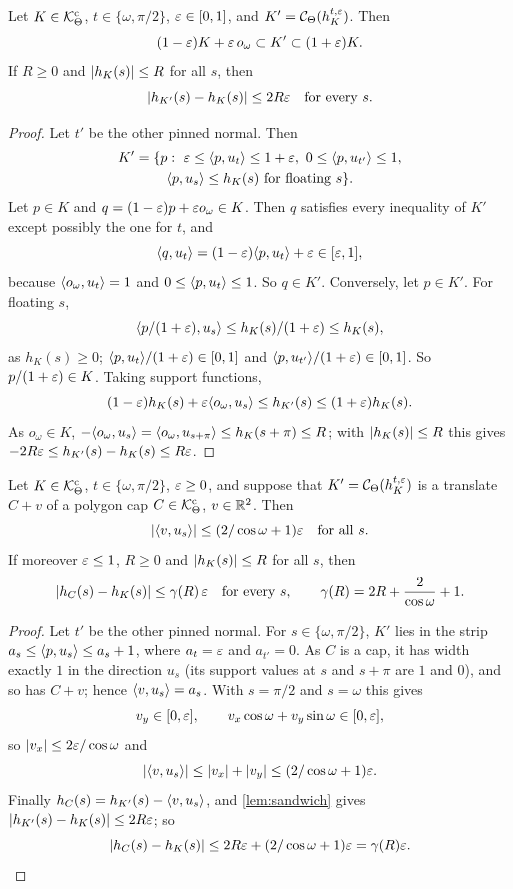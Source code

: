 \begin{lemma}\label{lem:sandwich}
Let $K\in\mathcal{K}^{\mathrm{c}}_\Theta$, $t\in\{\omega,\pi/2\}$, $\varepsilon\in[0,1]$, and
$K'=\mathcal{C}_\Theta(h_K^{t,\varepsilon})$. Then
\[
  (1-\varepsilon)K+\varepsilon\,o_\omega\subset K'\subset(1+\varepsilon)K .
\]
If $R\ge0$ and $\lvert h_K(s)\rvert\le R$ for all $s$, then
\[
  \lvert h_{K'}(s)-h_K(s)\rvert\le2R\varepsilon\quad\text{for every }s.
\]
\end{lemma}

\begin{proof}
Let $t'$ be the other pinned normal. Then
\begin{multline*}
  K'=\{p:\ \varepsilon\le\langle p,u_t\rangle\le1+\varepsilon,\ 0\le\langle p,u_{t'}\rangle\le1,\\
    \langle p,u_s\rangle\le h_K(s)\text{ for floating }s\}.
\end{multline*}
Let $p\in K$ and $q=(1-\varepsilon)p+\varepsilon o_\omega\in K$. Then $q$ satisfies every
inequality of $K'$ except possibly the one for $t$, and
\[
  \langle q,u_t\rangle=(1-\varepsilon)\langle p,u_t\rangle+\varepsilon\in[\varepsilon,1],
\]
because $\langle o_\omega,u_t\rangle=1$ and $0\le\langle p,u_t\rangle\le1$. So $q\in K'$.
Conversely, let $p\in K'$. For floating $s$,
\[
  \langle p/(1+\varepsilon),u_s\rangle\le h_K(s)/(1+\varepsilon)\le h_K(s),
\]
as $h_K(s)\ge0$; $\langle p,u_t\rangle/(1+\varepsilon)\in[0,1]$ and $\langle p,u_{t'}\rangle/(1+\varepsilon)\in[0,1]$. So ${p/(1+\varepsilon)\in K}$. Taking support functions,
\[
  (1-\varepsilon)h_K(s)+\varepsilon\langle o_\omega,u_s\rangle\le h_{K'}(s)\le(1+\varepsilon)h_K(s).
\]
As $o_\omega\in K$, $-\langle o_\omega,u_s\rangle=\langle o_\omega,u_{s+\pi}\rangle\le
h_K(s+\pi)\le R$; with $\lvert h_K(s)\rvert\le R$ this gives $-2R\varepsilon\le
h_{K'}(s)-h_K(s)\le R\varepsilon$.
\end{proof}

\begin{lemma}\label{lem:back}
Let $K\in\mathcal{K}^{\mathrm{c}}_\Theta$, $t\in\{\omega,\pi/2\}$, $\varepsilon\ge0$, and suppose that
$K'=\mathcal{C}_\Theta(h_K^{t,\varepsilon})$ is a translate $C+v$ of a polygon cap
$C\in\mathcal{K}^{\mathrm{c}}_\Theta$, $v\in\mathbb{R}^2$. Then
\[
  \lvert \langle v,u_s\rangle\rvert\le(2/\cos\omega+1)\varepsilon\quad\text{for all }s.
\]
If moreover $\varepsilon\le1$, $R\ge0$ and $\lvert h_K(s)\rvert\le R$ for all $s$, then
\[
  \lvert h_C(s)-h_K(s)\rvert\le \gamma(R)\,\varepsilon\quad\text{for every }s,\qquad \gamma(R)
    =2R+\frac2{\cos\omega}+1 .
\]
\end{lemma}

\begin{proof}
Let $t'$ be the other pinned normal. For $s\in\{\omega,\pi/2\}$, $K'$ lies in
the strip $a_s\le\langle p,u_s\rangle\le a_s+1$, where $a_t=\varepsilon$ and $a_{t'}=0$. As $C$
is a cap, it has width exactly $1$ in the direction $u_s$ (its support values at
$s$ and $s+\pi$ are $1$ and $0$), and so has $C+v$; hence $\langle v,u_s\rangle=a_s$. With
$s=\pi/2$ and $s=\omega$ this gives
\[
  v_y\in[0,\varepsilon],\qquad v_x\cos\omega+v_y\sin\omega\in[0,\varepsilon],
\]
so $\lvert v_x\rvert\le2\varepsilon/\cos\omega$ and
\[
  \lvert \langle v,u_s\rangle\rvert\le\lvert v_x\rvert+\lvert v_y\rvert\le(2/\cos\omega+1)\varepsilon.
\]
Finally $h_C(s)=h_{K'}(s)-\langle v,u_s\rangle$, and \cref{lem:sandwich} gives
$\lvert h_{K'}(s)-h_K(s)\rvert\le2R\varepsilon$; so
\[
  \lvert h_C(s)-h_K(s)\rvert\le2R\varepsilon+(2/\cos\omega+1)\varepsilon=\gamma(R)\varepsilon.\qedhere
\]
\end{proof}

